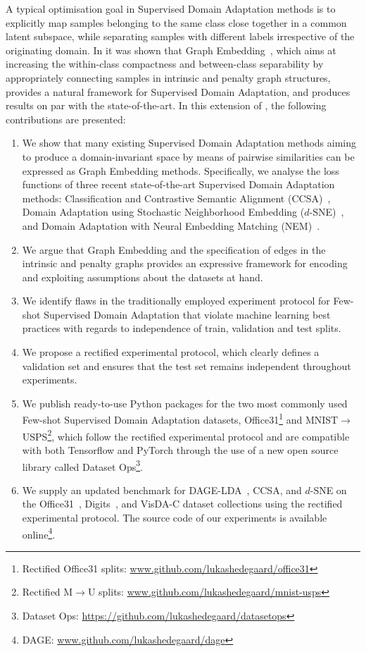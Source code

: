 \documentclass[journal]{IEEEtran}
\begin{document}
A typical optimisation goal in Supervised Domain Adaptation methods is to explicitly map samples belonging to the same class close together in a common latent subspace, while separating samples with different labels irrespective of the originating domain. 
In \cite{hedegaard2020supervised} it was shown that Graph Embedding~\cite{yan2006mfa}, which aims at increasing the within-class compactness and between-class separability by appropriately connecting samples in intrinsic and penalty graph structures, provides a natural framework for Supervised Domain Adaptation, and produces results on par with the state-of-the-art. 
In this extension of \cite{hedegaard2020supervised}, the following contributions are presented:
\begin{enumerate}
    \item We show that many existing Supervised Domain Adaptation methods aiming to produce a domain-invariant space by means of pairwise similarities can be expressed as Graph Embedding methods. Specifically, we analyse the loss functions of three recent state-of-the-art Supervised Domain Adaptation methods: Classification and Contrastive Semantic Alignment (CCSA)~\cite{motiian2017ccsa}, Domain Adaptation using Stochastic Neighborhood Embedding ($d$-SNE)~\cite{xu2019dsne}, and Domain Adaptation with Neural Embedding Matching (NEM)~\cite{wang2019nem}.
    \item We argue that Graph Embedding and the specification of edges in the intrinsic and penalty graphs provides an expressive framework for encoding and exploiting assumptions about the datasets at hand.
    \item We identify flaws in the traditionally employed experiment protocol for Few-shot Supervised Domain Adaptation that violate machine learning best practices with regards to independence of train, validation and test splits.
    \item We propose a rectified experimental protocol, which clearly defines a validation set and ensures that the test set remains independent throughout experiments.
    \item We publish ready-to-use Python packages for the two most commonly used Few-shot Supervised Domain Adaptation datasets, Office31\footnote{Rectified Office31 splits: \url{www.github.com/lukashedegaard/office31}} and MNIST$\rightarrow$USPS\footnote{Rectified M$\rightarrow$U splits: \url{www.github.com/lukashedegaard/mnist-usps}}, which follow the rectified experimental protocol and are compatible with both Tensorflow and PyTorch through the use of a new open source library called Dataset Ops\footnote{Dataset Ops: \url{https://github.com/lukashedegaard/datasetops}}.
    \item We supply an updated benchmark for DAGE-LDA~\cite{hedegaard2020supervised}, CCSA, and $d$-SNE on the Office31~\cite{saenko2010adapting}, Digits~\cite{lecun1998gradient, lecun90handwritten, netzer2011reading, ganin2016domain}, and VisDA-C\cite{peng2018visda} dataset collections using the rectified experimental protocol. The source code of our experiments is available online\footnote{DAGE: \url{www.github.com/lukashedegaard/dage}}.
\end{enumerate}
\end{document}
